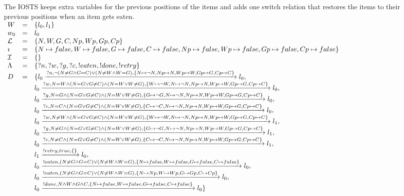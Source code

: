 The IOSTS keeps extra variables for the previous positions of the items and adds one switch relation that restores the items to their previous positions when an item gets eaten.
\vspace{5px} \\
$\begin{array}{lcl}
W & = & \{l_0, l_1\} \\
w_0 & = & l_0 \\
\mathcal{L} & = & \{N,W,G,C,Np, Wp, Gp, Cp\} \\
\imath & = & \{N \mapsto false, W \mapsto false, G \mapsto false, C \mapsto false,Np \mapsto false, Wp \mapsto false, Gp \mapsto false, Cp \mapsto false\} \\
\mathcal{I} & = & \{\} \\
\Lambda & = & \{?n, ?w, ?g, ?c, !eaten, !done, !retry\} \\
D & = & \{l_0\xrightarrow{?n, \neg(N \neq G \land G=C)\lor(N \neq W \land W=G), \{N \mapsto \neg N, Np \mapsto N, Wp \mapsto W, Gp \mapsto G, Cp \mapsto C\}}l_0, \\
& & l_0\xrightarrow{?w, N=W \land (N = G \lor G\neq C)\land (N = W \lor W\neq G), \{W \mapsto \neg W, N \mapsto \neg N, Np \mapsto N, Wp \mapsto W, Gp \mapsto G, Cp \mapsto C\}}l_0,\\
& & l_0\xrightarrow{?g, N=G \land (N = G \lor G\neq C)\land (N = W \lor W\neq G), \{G \mapsto \neg G, N \mapsto \neg N, Np \mapsto N, Wp \mapsto W, Gp \mapsto G, Cp \mapsto C\}}l_0,\\
& & l_0\xrightarrow{?c, N=C \land (N = G \lor G\neq C)\land (N = W \lor W\neq G), \{C \mapsto \neg C, N \mapsto \neg N, Np \mapsto N, Wp \mapsto W, Gp \mapsto G, Cp \mapsto C\}}l_0,\\
& & l_0\xrightarrow{?w, N\neq W \land (N = G \lor G\neq C)\land (N = W \lor W\neq G), \{W \mapsto \neg W, N \mapsto \neg N, Np \mapsto N, Wp \mapsto W, Gp \mapsto G, Cp \mapsto C\}}l_1,\\
& & l_0\xrightarrow{?g, N\neq G \land (N = G \lor G\neq C)\land (N = W \lor W\neq G), \{G \mapsto \neg G, N \mapsto \neg N, Np \mapsto N, Wp \mapsto W, Gp \mapsto G, Cp \mapsto C\}}l_1,\\
& & l_0\xrightarrow{?c, N\neq C \land (N = G \lor G\neq C)\land (N = W \lor W\neq G), \{C \mapsto \neg C, N \mapsto \neg N, Np \mapsto N, Wp \mapsto W, Gp \mapsto G, Cp \mapsto C\}}l_1,\\
& & l_1\xrightarrow{!retry,true,\{\}}l_0,\\
& & l_0\xrightarrow{!eaten, (N \neq G \land G=C)\lor(N \neq W \land W=G), \{N \mapsto false, W \mapsto false, G \mapsto false, C \mapsto false\}}l_0, \\
& & l_0\xrightarrow{!eaten, (N \neq G \land G=C)\lor(N \neq W \land W=G), \{N \mapsto Np, W \mapsto Wp, G \mapsto Gp, C \mapsto Cp\}}l_0, \\
& & l_0\xrightarrow{!done, N \land W \land G \land C, \{N \mapsto false, W \mapsto false, G \mapsto false, C \mapsto false\}}l_0\}
\end{array}$

